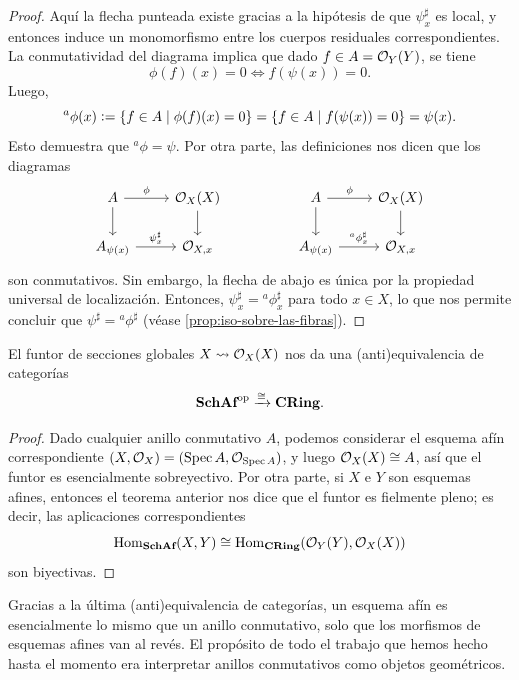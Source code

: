 \documentclass{article}
\numberwithin{equation}{section}
\theoremstyle{definition}
\begin{document}
\begin{teorema}
\begin{proof}
    Aquí la flecha punteada existe gracias a la hipótesis de que $\psi^\sharp_x$
    es local, y entonces induce un monomorfismo entre los cuerpos residuales
    correspondientes. La conmutatividad del diagrama implica que dado
    $f \in A = \mathcal{O}_Y (Y)$, se tiene
    $$\phi (f) (x) = 0 \iff f (\psi (x)) = 0.$$
    Luego,
    \[ {}^a \phi (x) \mathrel{\mathop:}= \{ f \in A \mid \phi (f) (x) = 0 \} =
       \{ f \in A \mid f (\psi (x)) = 0 \} = \psi (x). \]
    Esto demuestra que ${}^a \phi = \psi$. Por otra parte, las definiciones nos
    dicen que los diagramas
    \[ \begin{tikzcd}
        A \ar{r}{\phi}\ar{d} & \O_X (X)\ar{d} && A \ar{r}{\phi}\ar{d} & \O_X (X)\ar{d} \\
        A_{\psi (x)} \ar{r}{\psi^\sharp_x} & \O_{X,x} && A_{\psi (x)} \ar{r}{{}^a \phi^\sharp_x} & \O_{X,x}
      \end{tikzcd} \]
    son conmutativos. Sin embargo, la flecha de abajo es única por la propiedad
    universal de localización. Entonces, $\psi^\sharp_x = {}^a \phi^\sharp_x$
    para todo $x \in X$, lo que nos permite concluir que
    $\psi^\sharp = {}^a \phi^\sharp$ (véase \ref{prop:iso-sobre-las-fibras}).
  \end{proof}
\end{teorema}

\begin{corolario}
  \label{cor:antiequivalencia-esquemas-afines-anillos}
  El funtor de secciones globales $X \rightsquigarrow \mathcal{O}_X (X)$ nos da una
  (anti)equivalencia de categorías
  $$\text{\bf SchAf}^\mathrm{op} \xrightarrow{\cong} \text{\bf CRing}.$$

  \begin{proof}
    Dado cualquier anillo conmutativo $A$, podemos considerar el esquema afín
    correspondiente $(X,\mathcal{O}_X) = (\operatorname{Spec} A, \mathcal{O}_{\operatorname{Spec} A})$, y luego
    $\mathcal{O}_X (X) \cong A$, así que el funtor es esencialmente sobreyectivo.
    Por otra parte, si $X$ e $Y$ son esquemas afines, entonces el teorema
    anterior nos dice que el funtor es fielmente pleno; es decir,
    las aplicaciones correspondientes
    $$\operatorname{Hom}_{\text{\bf SchAf}} (X, Y) \cong \operatorname{Hom}_{\text{\bf CRing}} (\mathcal{O}_Y (Y), \mathcal{O}_X (X))$$
    son biyectivas.
  \end{proof}
\end{corolario}

Gracias a la última (anti)equivalencia de categorías, un esquema afín es
esencialmente lo mismo que un anillo conmutativo, solo que los morfismos
de esquemas afines van al revés. El propósito de todo el trabajo que hemos hecho
hasta el momento era interpretar anillos conmutativos como objetos geométricos.
\end{document}

